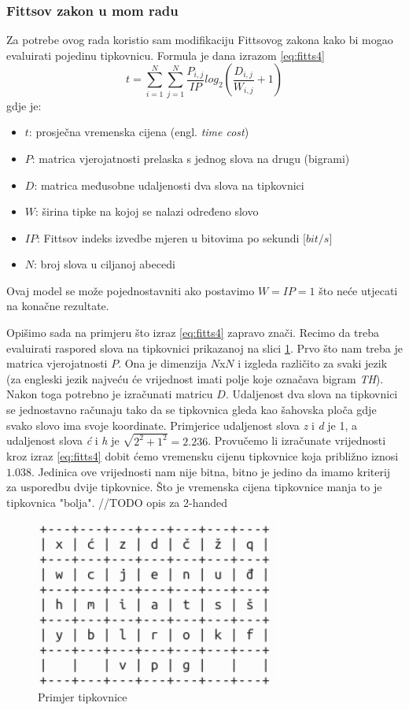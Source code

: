 \documentclass[times, utf8, zavrsni]{fer}
\begin{document}
\subsubsection{Fittsov zakon u mom radu}
Za potrebe ovog rada koristio sam modifikaciju Fittsovog zakona kako bi mogao evaluirati pojedinu tipkovnicu. Formula je dana izrazom \ref{eq:fitts4}
\begin{equation}
\label{eq:fitts4}
t = \sum_{i=1}^{N}\sum_{j=1}^{N}\frac{P_{i,j}}{IP}log_2(\frac{D_{i,j}}{W_{i,j}} + 1)
\end{equation}
gdje je:
\begin{itemize}
\item $t$: prosječna vremenska cijena (engl. \emph{time cost})
\item $P$: matrica vjerojatnosti prelaska s jednog slova na drugu (bigrami)
\item $D$: matrica međusobne udaljenosti dva slova na tipkovnici
\item $W$: širina tipke na kojoj se nalazi određeno slovo
\item $IP$: Fittsov indeks izvedbe mjeren u bitovima po sekundi [$bit/s$]
\item $N$: broj slova u ciljanoj abecedi
\end{itemize}
Ovaj model se može pojednostavniti ako postavimo $W=IP=1$ što neće utjecati na konačne rezultate.

Opišimo sada na primjeru što izraz \ref{eq:fitts4} zapravo znači. Recimo da treba evaluirati raspored slova na tipkovnici prikazanoj na slici \ref{fig:fitts_primjer}. Prvo što nam treba je matrica vjerojatnosti $P$. Ona je dimenzija $N$x$N$ i izgleda različito za svaki jezik (za engleski jezik najveću će vrijednost imati polje koje označava bigram \emph{TH}). Nakon toga potrebno je izračunati matricu $D$. Udaljenost dva slova na tipkovnici se jednostavno računaju tako da se tipkovnica gleda kao šahovska ploča gdje svako slovo ima svoje koordinate. Primjerice udaljenost slova \emph{z} i \emph{d} je 1, a udaljenost slova \emph{ć} i \emph{h} je $\sqrt{2^2+1^2} = 2.236$. Provučemo li izračunate vrijednosti kroz izraz \ref{eq:fitts4} dobit ćemo vremensku cijenu tipkovnice koja približno iznosi $1.038$. Jedinica ove vrijednosti nam nije bitna, bitno je jedino da imamo kriterij za usporedbu dvije tipkovnice. Što je vremenska cijena tipkovnice manja to je tipkovnica "bolja". //TODO opis za 2-handed
\begin{figure}[htb]
\centering
\includegraphics[width=8cm]{img/primjer.png}
\caption{Primjer tipkovnice}
\label{fig:fitts_primjer}
\end{figure}
\end{document}
